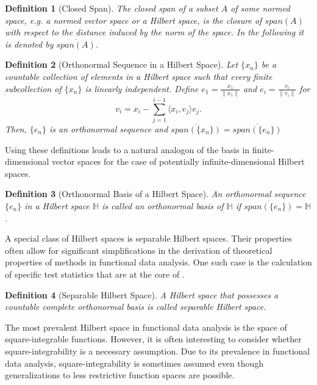 \documentclass[12pt, a4paper]{article}
\theoremstyle{MAstyle} \newtheorem{assumption}{Assumption}[section]
\theoremstyle{MAstyle} \newtheorem{definition}{Definition}[section]
\theoremstyle{MAstyle} \newtheorem{theorem}{Theorem}[section]
\begin{document}
			\begin{definition}[Closed Span]
				The closed span of a subset $A$ of some normed space, e.g. a normed vector space or a Hilbert space, is the closure of $\textit{span}\left(A\right)$ with respect to the distance induced by the norm of the space. In the following it is denoted by $\overline{{\textit{span}\left(A\right)}}$.
			\end{definition}
		
			\begin{definition}[Orthonormal Sequence in a Hilbert Space]
				Let $\{x_n\}$ be a countable collection of elements in a Hilbert space such that every finite subcollection of $\{x_n\}$ is linearly independent. Define $e_1 = \frac{x_1}{\| x_1 \|}$ and $e_i = \frac{v_i}{\| v_i \|}$ for 
				$$v_i = x_i - \sum_{j = 1}^{i - 1}\langle x_i, e_j\rangle e_j.$$
				Then, $\{e_n\}$ is an orthonormal sequence and $\overline{{\textit{span}\left(\{x_n\}\right)}} = \overline{{\textit{span}\left(\{e_n\}\right)}}$
			\end{definition}
			Using these definitions leads to a natural analogon of the basis in finite-dimensional vector spaces for the case of potentially infinite-dimensional Hilbert spaces.
			\begin{definition}[Orthonormal Basis of a Hilbert Space]
				An orthonormal sequence $\{e_n\}$ in a Hilbert space $\mathbb{H}$ is called an orthonormal basis of $\mathbb{H}$ if $\overline{{\textit{span}\left(\{e_n\}\right)}} = \mathbb{H}$. 
			\end{definition}
			
			A special class of Hilbert spaces is separable Hilbert spaces. Their properties often allow for significant simplifications in the derivation of theoretical properties of methods in functional data analysis. One such case is the calculation of specific test statistics that are at the core of \cite{bugni_permutation_2021}.
			\begin{definition}[Separable Hilbert Space]
				A Hilbert space that possesses a countable complete orthonormal basis is called separable Hilbert space.
			\end{definition}
			
			The most prevalent Hilbert space in functional data analysis is the space of square-integrable functions. However, it is often interesting to consider whether square-integrability is a necessary assumption. Due to its prevalence in functional data analysis, square-integrability is sometimes assumed even though generalizations to less restrictive function spaces are possible.
			
\end{document}
